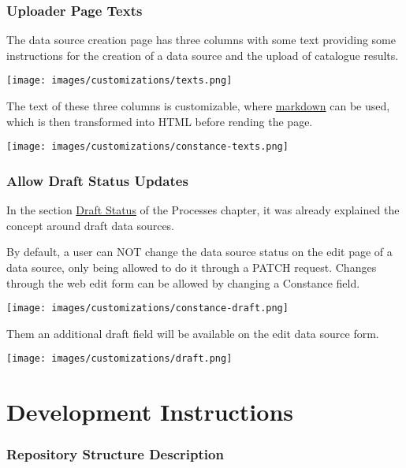 \documentclass[
]{book}
\begin{document}
\hypertarget{uploader-page-texts}{%
\subsection*{Uploader Page Texts}\label{uploader-page-texts}}

The data source creation page has three columns with some text providing some instructions for the creation of a data source and the upload of catalogue results.

\texttt{[image: images/customizations/texts.png]}

The text of these three columns is customizable, where \href{https://www.markdownguide.org/}{markdown} can be used, which is then transformed into HTML before rending the page.

\texttt{[image: images/customizations/constance-texts.png]}

\hypertarget{allow-draft-status-updates}{%
\subsection*{Allow Draft Status Updates}\label{allow-draft-status-updates}}

In the section \href{processes.html\#draft-status}{Draft Status} of the Processes chapter, it was already explained the concept around draft data sources.

By default, a user can NOT change the data source status on the edit page of a data source, only being allowed to do it through a PATCH request.
Changes through the web edit form can be allowed by changing a Constance field.

\texttt{[image: images/customizations/constance-draft.png]}

Them an additional draft field will be available on the edit data source form.

\texttt{[image: images/customizations/draft.png]}

\hypertarget{development-instructions}{%
\chapter{Development Instructions}\label{development-instructions}}

\hypertarget{repository-structure-description}{%
\subsection*{Repository Structure Description}\label{repository-structure-description}}
\end{document}

